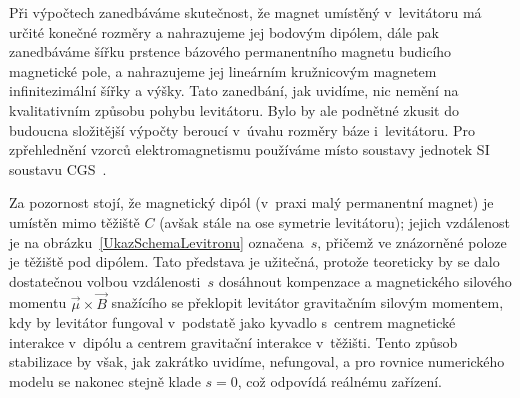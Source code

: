Při výpočtech zanedbáváme skutečnost, že magnet umístěný v~levitátoru má
určité konečné rozměry a nahrazujeme jej bodovým dipólem, dále pak zanedbáváme
šířku prstence bázového permanentního magnetu budicího magnetické pole, a
nahrazujeme jej lineárním kružnicovým magnetem infinitezimální šířky a
výšky. Tato zanedbání, jak uvidíme, nic nemění na kvalitativním způsobu pohybu
levitátoru. Bylo by ale podnětné zkusit do budoucna složitější výpočty beroucí
v~úvahu rozměry báze i~levitátoru. Pro zpřehlednění vzorců elektromagnetismu
používáme místo soustavy jednotek SI soustavu
CGS~\cite{Pur-Mor:2013:ElectMagn:3}.

Za pozornost stojí, že magnetický dipól (v~praxi malý permanentní magnet) je
umístěn mimo těžiště $C$ (avšak stále na ose symetrie levitátoru); jejich
vzdálenost je na obrázku~\ref{UkazSchemaLevitronu} označena~$s$, přičemž ve
znázorněné  poloze je těžiště pod dipólem. Tato představa je
užitečná, protože teoreticky by se dalo dostatečnou volbou vzdálenosti~$s$
dosáhnout kompenzace a magnetického silového momentu $\vec{\mu}\times\vec{B}$
snažícího se překlopit levitátor gravitačním silovým momentem, kdy by
levitátor fungoval v~podstatě jako kyvadlo s~centrem magnetické interakce
v~dipólu a centrem gravitační interakce v~těžišti. Tento způsob stabilizace by
však, jak zakrátko uvidíme, nefungoval, a pro rovnice numerického modelu se
nakonec stejně klade $s=0$, což odpovídá reálnému zařízení.

